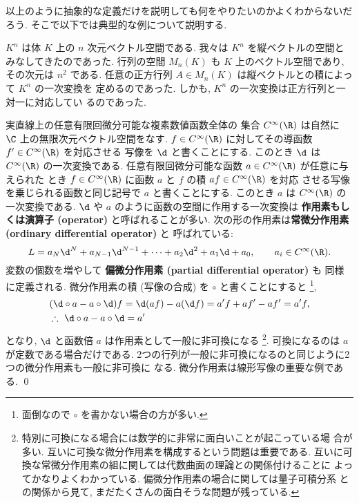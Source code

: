\documentclass[12pt,twoside]{jarticle}
\begin{document}
以上のように抽象的な定義だけを説明しても何をやりたいのかよくわからないだろう.
そこで以下では典型的な例について説明する.


\begin{example}[行列]
  $K^n$ は体 $K$ 上の $n$ 次元ベクトル空間である.
  我々は $K^n$ を縦ベクトルの空間とみなしてきたのであった.
  行列の空間 $M_n(K)$ も $K$ 上のベクトル空間であり, その次元は $n^2$ である.
  任意の正方行列 $A\in M_n(K)$ は縦ベクトルとの積によって $K^n$ の一次変換を
  定めるのであった.  しかも, $K^n$ の一次変換は正方行列と一対一に対応してい
  るのであった.  
\end{example}


\begin{example}[微分作用素]
  実直線上の任意有限回微分可能な複素数値函数全体の
  集合 $C^\infty(\R)$ は自然に $\C$ 上の無限次元ベクトル空間をなす.  
  $f\in C^\infty(\R)$ に対してその導函数 $f'\in C^\infty(\R)$ を対応させる
  写像を $\d$ と書くことにする. 
  このとき $\d$ は $C^\infty(\R)$ の一次変換である.
  任意有限回微分可能な函数 $a\in C^\infty(\R)$ が任意に与えられた
  とき $f\in C^\infty(\R)$ に函数 $a$ と $f$ の積 $af\in C^\infty(\R)$ を対応
  させる写像を乗じられる函数と同じ記号で $a$ と書くことにする. 
  このとき $a$ は $C^\infty(\R)$ の一次変換である.
  $\d$ や $a$ のように函数の空間に作用する一次変換は
  {\bf 作用素もしくは演算子 (operator)} と呼ばれることが多い.
  次の形の作用素は{\bf 常微分作用素 (ordinary differential operator)} と
  呼ばれている:
  \begin{equation*}
    L = a_N \d^N + a_{N-1} \d^{N-1} + \cdots + a_2 \d^2 + a_1 \d + a_0,
    \qquad
    a_i \in C^\infty(\R).
  \end{equation*}
  変数の個数を増やして {\bf 偏微分作用素 (partial differential operator)} も
  同様に定義される. 
  微分作用素の積 (写像の合成) を $\circ$ と書くことにすると%
  \footnote{面倒なので $\circ$ を書かない場合の方が多い.},
  \begin{align*}
    &
    (\d\circ a - a\circ\d)f
    = \d(af) - a(\d f)
    = a'f + af' - af'
    = a'f,
    \\ &
    \therefore\ \d\circ a - a\circ\d = a'
  \end{align*}
  となり, $\d$ と函数倍 $a$ は作用素として一般に非可換になる%
  \footnote{特別に可換になる場合には数学的に非常に面白いことが起こっている場
    合が多い.  互いに可換な微分作用素を構成するという問題は重要である. 
    互いに可換な常微分作用素の組に関しては代数曲面の理論との関係付けることに
    よってかなりよくわかっている.  偏微分作用素の場合に関しては量子可積分系
    との関係から見て, まだたくさんの面白そうな問題が残っている.}.  
  可換になるのは $a$ が定数である場合だけである.
  2つの行列が一般に非可換になるのと同じように2つの微分作用素も一般に非可換に
  なる.  微分作用素は線形写像の重要な例である.
  \qed
\end{example}
\end{document}
